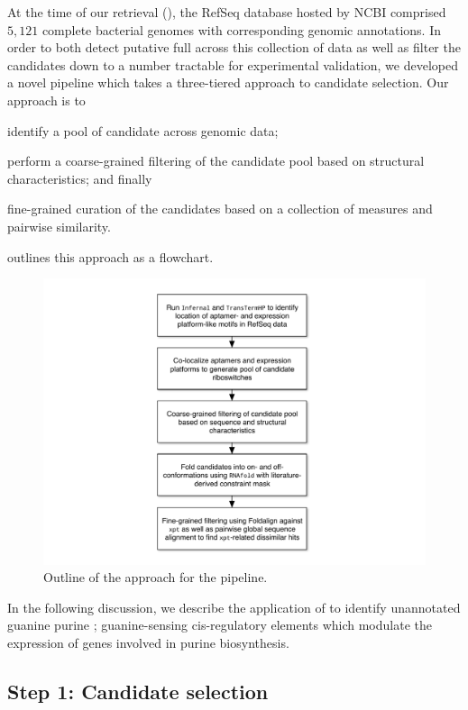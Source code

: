 At the time of our retrieval (\fnaRetrievalTime), the RefSeq database hosted by
NCBI comprised $5,121$ complete bacterial genomes with corresponding genomic
annotations. In order to both detect putative full \rbs across this
collection of data as well as filter the candidates down to a number tractable for
experimental validation, we developed a novel pipeline which takes a three-tiered
approach to candidate selection. Our approach is to
\begin{inparaenum}[\em 1\upshape)]
\item identify a pool of candidate \rbs across genomic data;
\item perform a coarse-grained filtering of the candidate pool based on structural
characteristics; and finally
\item fine-grained curation of the candidates based on a collection of measures
and pairwise similarity.
\end{inparaenum}  outlines this approach as a
flowchart.

\begin{figure}[!ht]
\centering
\includegraphics[width=.9\textwidth]{Figures/Ribofinder/ribofinderOverview.pdf}
\caption{Outline of the approach for the \rfinder pipeline.}
\label{fig:rfinder:flowchart}
\end{figure}

In the following discussion, we describe the application of \rfinder to identify
unannotated guanine purine \rbs; guanine-sensing cis-regulatory elements
which modulate the expression of genes involved in purine biosynthesis.

\subsection{Step 1: Candidate selection}
\label{subsec:rfinder:selection}

